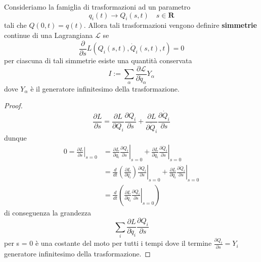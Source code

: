 \begin{theorem}
Consideriamo la famiglia di trasformazioni ad un parametro 
\begin{equation}
q_i(t) \rightarrow Q_i(s, t) \quad s \in \mathbf{R}
\end{equation}
tali che $Q(0,t) = q(t)$. Allora tali trasformazioni vengono definire \textbf{simmetrie} continue di una Lagrangiana $\mathcal{L}$ se 
\begin{equation}
\frac{\partial}{\partial s} L\left(Q_i(s, t), \dot{Q}_i(s, t), t\right)=0
\end{equation}
per ciascuna di tali simmetrie esiste una quantit\`{a} conservata 
\begin{equation}
I:=\sum_\alpha \frac{\partial \mathcal{L}}{\partial \dot{q}_{\alpha}} Y_\alpha
\end{equation}
dove $Y_{\alpha}$ \`{e} il generatore infinitesimo della trasformazione.
\end{theorem}

\begin{proof}
	\begin{equation}
\frac{\partial L}{\partial s}=\frac{\partial L}{\partial Q_i} \frac{\partial Q_i}{\partial s}+\frac{\partial L}{\partial \dot{Q}_i} \frac{\partial \dot{Q}_i}{\partial s}
\end{equation}
dunque 
\begin{equation}
\begin{aligned}
0=\left.\frac{\partial L}{\partial s}\right|_{s=0} & =\left.\frac{\partial L}{\partial q_i} \frac{\partial Q_i}{\partial s}\right|_{s=0}+\left.\frac{\partial L}{\partial \dot{q}_i} \frac{\partial \dot{Q}_i}{\partial s}\right|_{s=0} \\
& =\left.\frac{d}{d t}\left(\frac{\partial L}{\partial \dot{q}_i}\right) \frac{\partial Q_i}{\partial s}\right|_{s=0}+\left.\frac{\partial L}{\partial \dot{q}_i} \frac{\partial \dot{Q}_i}{\partial s}\right|_{s=0} \\
& =\frac{d}{d t}\left(\left.\frac{\partial L}{\partial \dot{q}_i} \frac{\partial Q_i}{\partial s}\right|_{s=0}\right)
\end{aligned}
\end{equation}
di conseguenza la grandezza 
\begin{equation}
\sum_i \frac{\partial L}{ \partial \dot{q}_i}\frac{\partial Q_i}{\partial s}
\end{equation}
per s = 0 \`{e} una costante del moto per tutti i tempi dove il termine $\frac{\partial Q_i}{\partial s} = Y_{i}$ generatore infinitesimo della trasformazione.

\end{proof}

